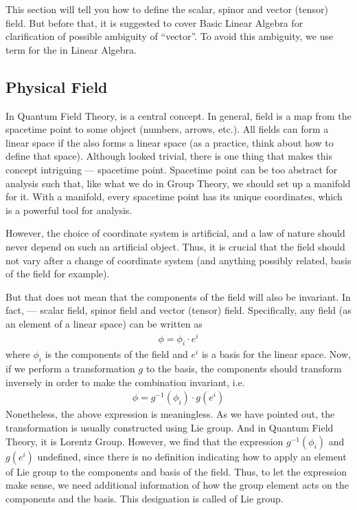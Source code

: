 \documentclass[letterpaper,10pt,english]{sphinxmanual}
\begin{document}
This section will tell you how to define the scalar, spinor and vector (tensor) field. But before that, it is suggested to cover Basic Linear Algebra for clarification of possible ambiguity of ``vector''. To avoid this ambiguity, we use term  for the  in Linear Algebra.


\subsection{Physical Field}
\label{\detokenize{field:physical-field}}
In Quantum Field Theory,  is a central concept. In general, field is a map from the spacetime point to some object (numbers, arrows, etc.). All fields can form a linear space if the  also forms a linear space (as a practice, think about how to define that space). Although looked trivial, there is one thing that makes this concept intriguing --- spacetime point. Spacetime point can be too abstract for analysis such that, like what we do in Group Theory, we should set up a manifold for it. With a manifold, every spacetime point has its unique coordinates, which is a powerful tool for analysis.

However, the choice of coordinate system is artificial, and a law of nature should never depend on such an artificial object. Thus, it is crucial that the field should not vary after a change of coordinate system (and anything possibly related, basis of the field for example).

But that does not mean that the components of the field will also be invariant. In fact,  --- scalar field, spinor field and vector (tensor) field. Specifically, any field (as an element of a linear space) can be written as
\begin{equation*}
\begin{split}\phi = \phi_i \cdot e^i\end{split}
\end{equation*}
where \(\phi_i\) is the components of the field and \(e^i\) is a basis for the linear space. Now, if we perform a transformation \(g\) to the basis, the components should transform inversely in order to make the combination invariant, i.e.
\begin{equation*}
\begin{split}\phi = g^{-1}(\phi_i)\cdot g(e^i)\end{split}
\end{equation*}
Nonetheless, the above expression is meaningless. As we have pointed out, the transformation is usually constructed using Lie group. And in Quantum Field Theory, it is Lorentz Group. However, we find that the expression \(g^{-1}(\phi_i)\) and \(g(e^i)\) undefined, since there is no definition indicating how to apply an element of Lie group to the components and basis of the field. Thus, to let the expression make sense, we need additional information of how the group element acts on the components and the basis. This designation is called  of Lie group.
\end{document}
